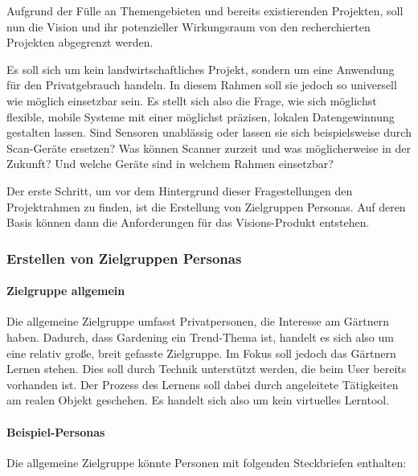 Aufgrund der Fülle an Themengebieten und bereits existierenden
Projekten, soll nun die Vision und ihr potenzieller Wirkungsraum von den
recherchierten Projekten abgegrenzt werden.

Es soll sich um kein landwirtschaftliches Projekt, sondern um eine
Anwendung für den Privatgebrauch handeln. In diesem Rahmen soll sie
jedoch so universell wie möglich einsetzbar sein. Es stellt sich also
die Frage, wie sich möglichst flexible, mobile Systeme mit einer
möglichst präzisen, lokalen Datengewinnung gestalten lassen. Sind
Sensoren unablässig oder lassen sie sich beispielsweise durch
Scan-Geräte ersetzen? Was können Scanner zurzeit und was möglicherweise
in der Zukunft? Und welche Geräte sind in welchem Rahmen einsetzbar?

Der erste Schritt, um vor dem Hintergrund dieser Fragestellungen den
Projektrahmen zu finden, ist die Erstellung von Zielgruppen Personas.
Auf deren Basis können dann die Anforderungen für das Visions-Produkt
entstehen.

\hypertarget{erstellen-von-zielgruppen-personas}{%
\subsubsection{Erstellen von Zielgruppen
Personas}\label{erstellen-von-zielgruppen-personas}}

\hypertarget{zielgruppe-allgemein}{%
\paragraph{Zielgruppe allgemein}\label{zielgruppe-allgemein}}

Die allgemeine Zielgruppe umfasst Privatpersonen, die Interesse am
Gärtnern haben. Dadurch, dass Gardening ein Trend-Thema ist, handelt es
sich also um eine relativ große, breit gefasste Zielgruppe. Im Fokus
soll jedoch das Gärtnern Lernen stehen. Dies soll durch Technik
unterstützt werden, die beim User bereits vorhanden ist. Der Prozess des
Lernens soll dabei durch angeleitete Tätigkeiten am realen Objekt
geschehen. Es handelt sich also um kein virtuelles Lerntool.

\hypertarget{beispiel-personas}{%
\paragraph{Beispiel-Personas}\label{beispiel-personas}}

Die allgemeine Zielgruppe könnte Personen mit folgenden Steckbriefen
enthalten:

